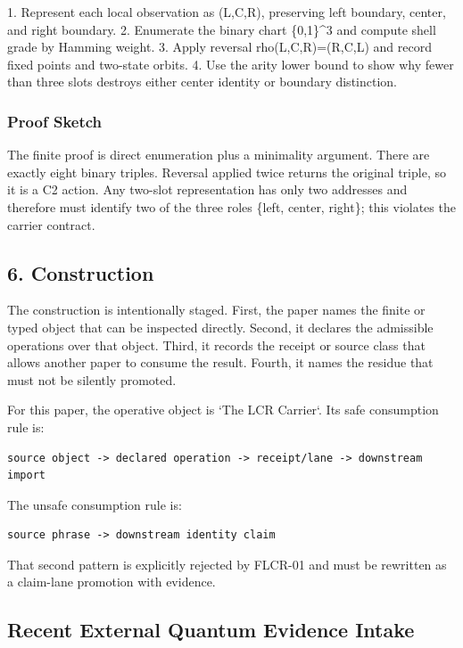 \documentclass[11pt]{article}
\begin{document}
1. Represent each local observation as (L,C,R), preserving left boundary, center, and right boundary.
2. Enumerate the binary chart \{0,1\}\textasciicircum{}3 and compute shell grade by Hamming weight.
3. Apply reversal rho(L,C,R)=(R,C,L) and record fixed points and two-state orbits.
4. Use the arity lower bound to show why fewer than three slots destroys either center identity or boundary distinction.

\subsubsection*{Proof Sketch}

The finite proof is direct enumeration plus a minimality argument. There are exactly eight binary triples. Reversal applied twice returns the original triple, so it is a C2 action. Any two-slot representation has only two addresses and therefore must identify two of the three roles \{left, center, right\}; this violates the carrier contract.

\subsection*{6. Construction}

The construction is intentionally staged. First, the paper names the finite or
typed object that can be inspected directly. Second, it declares the admissible
operations over that object. Third, it records the receipt or source class that
allows another paper to consume the result. Fourth, it names the residue that
must not be silently promoted.

For this paper, the operative object is `The LCR Carrier`. Its safe consumption
rule is:

\begin{verbatim}
source object -> declared operation -> receipt/lane -> downstream import
\end{verbatim}

The unsafe consumption rule is:

\begin{verbatim}
source phrase -> downstream identity claim
\end{verbatim}

That second pattern is explicitly rejected by FLCR-01 and must be rewritten as
a claim-lane promotion with evidence.

\subsection*{Recent External Quantum Evidence Intake}
\end{document}
